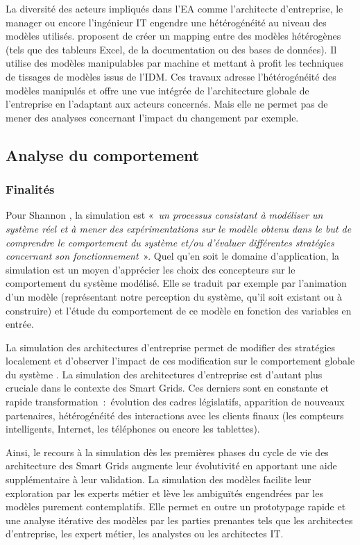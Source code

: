 	La diversité des acteurs impliqués dans l'EA comme l'architecte d'entreprise, le manager ou encore l'ingénieur IT engendre une hétérogénéité au niveau des modèles utilisés. \cite{bruneliere2013support} proposent de créer un mapping entre des modèles hétérogènes (tels que des tableurs Excel, de la documentation ou des bases de données). Il utilise des modèles manipulables par machine et mettant à profit les techniques de tissages de modèles issus de l'IDM. Ces travaux adresse l'hétérogénéité des modèles manipulés et offre une vue intégrée de l'architecture globale de l'entreprise en l'adaptant aux acteurs concernés. Mais elle ne permet pas de mener des analyses concernant l'impact du changement par exemple.   

	
	\subsection{Analyse du comportement}
	\subsubsection{Finalités}
	Pour Shannon \cite{shannon1975systems}, la simulation est 
«~\emph{un processus consistant à modéliser un système réel et à mener des expérimentations sur le modèle obtenu dans le but de comprendre le comportement du système et/ou d'évaluer différentes stratégies concernant son fonctionnement}~». 
Quel qu'en soit le domaine d'application, la simulation est un moyen d'apprécier les choix des concepteurs sur le comportement du système modélisé. Elle se traduit par exemple par l'animation d'un modèle (représentant notre perception du système, qu'il soit existant ou à construire) et l'étude du comportement de ce modèle en fonction des variables en entrée.  

La simulation des architectures d'entreprise permet de modifier des stratégies localement et d'observer l'impact de ces modification sur le comportement globale du système \cite{2008towards}. La simulation des architectures d'entreprise est d'autant plus cruciale dans le contexte des Smart Grids. Ces derniers sont en constante et rapide transformation~:~évolution des cadres législatifs, apparition de nouveaux partenaires, hétérogénéité des interactions avec les clients finaux (les compteurs intelligents, Internet, les téléphones ou encore les tablettes). 

Ainsi, le recours à la simulation dès les premières phases du cycle de vie des architecture des Smart Grids augmente leur évolutivité en apportant une aide supplémentaire à leur validation. La simulation des modèles facilite leur exploration  par les experts métier et lève les ambiguïtés engendrées par les modèles purement contemplatifs. Elle permet en outre un prototypage rapide et une analyse itérative des modèles par les parties prenantes tels que les architectes d'entreprise, les expert métier, les analystes ou les architectes IT.

